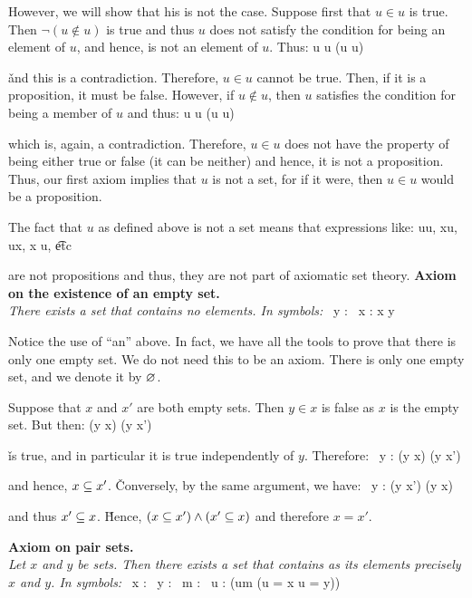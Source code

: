 However, we will show that his is not the case. Suppose first that $u\in u$ is true. Then $\neg(u\notin u)$ is true
and thus $u$ does not satisfy the condition for being an element of $u$, and hence, is not an element of $u$. Thus:
\bse
u \in u \imp \neg(u \in u)
\ese

\v

and this is a contradiction. Therefore, $u\in u$ cannot be true. Then, if it is a proposition, it must be false.
However, if $u \notin u$, then $u$ satisfies the condition for being a member of $u$ and thus:
\bse
u \notin u \imp \neg(u \notin u)
\ese

which is, again, a contradiction. Therefore, $u\in u$ does not have the property of being either true or false (it
can be neither) and hence, it is not a proposition. Thus, our first axiom implies that $u$ is not a set, for if it
were, then $u\in u$ would be a proposition.
\ee

The fact that $u$ as defined above is not a set means that expressions like:
\bse
u\in u, \quad x\in u, \quad u\in x, \quad x \notin u, \quad \t{etc}
\ese

are not propositions and thus, they are not part of axiomatic set theory. \v

\textbf{Axiom on the existence of an empty set.}\\
\emph{There exists a set that contains no elements. In symbols:}
\bse
\exists \, y : \forall \, x : x \notin y
\ese

Notice the use of ``an'' above. In fact, we have all the tools to prove that there is only one empty set. We do not
need this to be an axiom.
\bt[]
There is only one empty set, and we denote it by $\varnothing$.
\et

\bq
Suppose that $x$ and $x'$ are both empty sets. Then $y\in x$ is false as $x$ is the empty set. But then:
\bse
(y \in x) \imp (y \in x')
\ese

\v

is true, and in particular it is true independently of $y$. Therefore:
\bse
\forall \, y : (y \in x) \imp (y \in x')
\ese

and hence, $x \subseteq x'$. \v

Conversely, by the same argument, we have:
\bse
\forall \, y : (y \in x') \imp (y \in x)
\ese

and thus $x' \subseteq x$. \v

Hence, $(x \subseteq x') \land (x' \subseteq x)$ and therefore $x = x'$.
\eq

\textbf{Axiom on pair sets.} \\
\emph{Let $x$ and $y$ be sets. Then there exists a set that contains as its elements precisely $x$ and $y$. In symbols:}
\bse
\forall \, x : \forall \, y : \exists \, m : \forall \, u : (u\in m \eqv (u = x \lor u = y))
\ese

